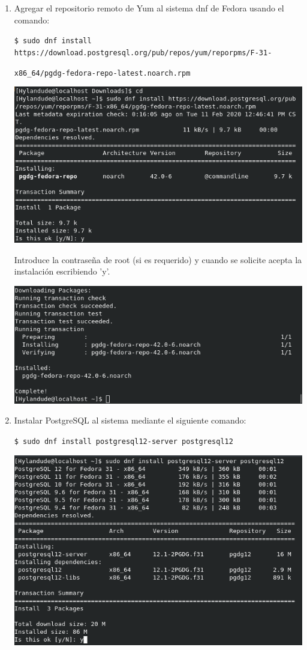 \documentclass{exam}
\begin{document}
\begin{enumerate}
	\item Agregar el repositorio remoto de Yum al sistema dnf de Fedora usando el comando:
	
	\verb|$ sudo dnf install https://download.postgresql.org/pub/repos/yum/reporpms/F-31-|
	
	\verb|x86_64/pgdg-fedora-repo-latest.noarch.rpm|

	\includegraphics[scale=0.75]{./imgFarrera/postgress_install_1.png}	

	Introduce la contraseña de root (si es requerido) y cuando se solicite acepta la instalación escribiendo 'y'.
	
	\includegraphics[scale=0.75]{./imgFarrera/postgress_install_2.png}

	\item Instalar PostgreSQL al sistema mediante el siguiente comando:
	
	\verb|$ sudo dnf install postgresql12-server postgresql12|
	
	\includegraphics[scale=0.75]{./imgFarrera/postgress_install_3.png}	
	

\end{enumerate}
\end{document}

